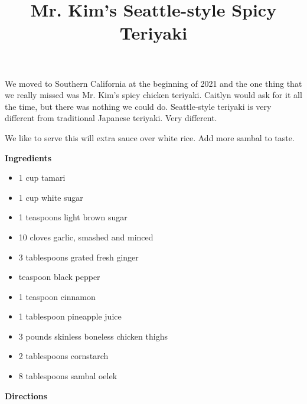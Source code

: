 \documentclass{article}
\title{Mr. Kim's Seattle-style Spicy Teriyaki}
\begin{document}
We moved to Southern California at the beginning of 2021 and the one thing
that we really missed was Mr. Kim's spicy chicken teriyaki. Caitlyn would
ask for it all the time, but there was nothing we could do. Seattle-style
teriyaki is very different from traditional Japanese teriyaki. Very different.

We like to serve this will extra sauce over white rice. Add more sambal to taste.

\bigskip

\bigskip

\textbf{Ingredients}

\begin{itemize}
      \item 1 cup tamari
      \item 1 cup white sugar
      \item 1 teaspoons light brown sugar
      \item 10 cloves garlic, smashed and minced
      \item 3 tablespoons grated fresh ginger
      \item {} teaspoon black pepper
      \item 1 teaspoon cinnamon
      \item 1 tablespoon pineapple juice
      \item 3 pounds skinless boneless chicken thighs
      \item 2 tablespoons cornstarch
      \item 8 tablespoons sambal oelek
\end{itemize}

\bigskip

\textbf{Directions}
\end{document}
